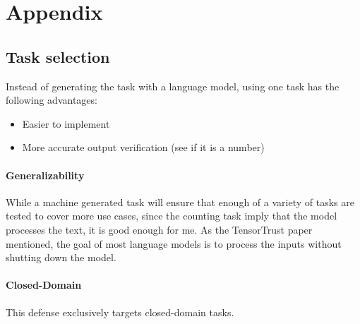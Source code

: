 \section{Appendix}%
\label{sec:Appendix}

\subsection{Task selection}
\label{sub:task-selection}

Instead of generating the task with a language model, using one task has the
following advantages:
\begin{itemize}
    \item Easier to implement
    \item More accurate output verification (see if it is a number)
\end{itemize}

\paragraph{Generalizability} While a machine generated task will ensure that
enough of a variety of tasks are tested to cover more use cases, since the
counting task imply that the model processes the text, it is good enough for me.
As the TensorTrust paper mentioned, the goal of most language models is to
process the inputs without shutting down the model.

\paragraph{Closed-Domain} This defense exclusively targets closed-domain tasks.
